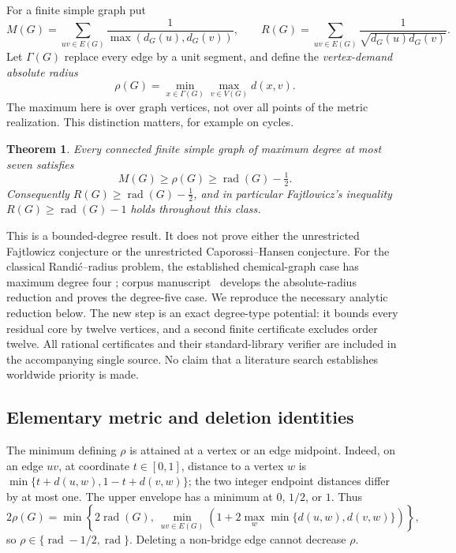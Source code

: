 \documentclass[11pt,a4paper]{article}
\newtheorem{theorem}{Theorem}[section]
\theoremstyle{definition}\newtheorem{definition}[theorem]{Definition}
\theoremstyle{remark}\newtheorem{remark}[theorem]{Remark}
\begin{document}
For a finite simple graph put
\[
 M(G)=\sum_{uv\in E(G)}\frac1{\max(d_G(u),d_G(v))},
 \qquad R(G)=\sum_{uv\in E(G)}\frac1{\sqrt{d_G(u)d_G(v)}}.
\]
Let $\Gamma(G)$ replace every edge by a unit segment, and define the
\emph{vertex-demand absolute radius}
\[
 \rho(G)=\min_{x\in\Gamma(G)}\max_{v\in V(G)}d(x,v).
\]
The maximum here is over graph vertices, not over all points of the
metric realization. This distinction matters, for example on cycles.

\begin{theorem}\label{thm:g7-main}
Every connected finite simple graph of maximum degree at most seven satisfies
\[
 M(G)\ge\rho(G)\ge\operatorname{rad}(G)-\tfrac12.
\]
Consequently $R(G)\ge\operatorname{rad}(G)-\tfrac12$, and in particular
Fajtlowicz's inequality $R(G)\ge\operatorname{rad}(G)-1$ holds throughout
this class.
\end{theorem}

This is a bounded-degree result. It does not prove either the unrestricted
Fajtlowicz conjecture or the unrestricted Caporossi--Hansen conjecture.
For the classical Randi\'c--radius problem, the established
chemical-graph case has maximum degree four \cite{CPS}; corpus manuscript~\cite{Corpus087} develops the absolute-radius
reduction and proves the degree-five case. We reproduce the necessary
analytic reduction below. The new step is an exact degree-type potential:
it bounds every residual core by twelve vertices, and a second finite
certificate excludes order twelve. All rational certificates and their
standard-library verifier are included in the accompanying single source.
No claim that a literature search establishes worldwide priority is made.

\subsection{Elementary metric and deletion identities}

The minimum defining $\rho$ is attained at a vertex or an edge midpoint.
Indeed, on an edge $uv$, at coordinate $t\in[0,1]$, distance to a vertex
$w$ is $\min\{t+d(u,w),1-t+d(v,w)\}$; the two integer endpoint distances
differ by at most one. The upper envelope has a minimum at $0$, $1/2$,
or $1$. Thus
\begin{equation}\label{eq:g7-rhoformula}
 2\rho(G)=\min\left\{
 2\operatorname{rad}(G),\
 \min_{uv\in E(G)}\left(1+2\max_w\min\{d(u,w),d(v,w)\}\right)
 \right\},
\end{equation}
so $\rho\in\{\operatorname{rad}-1/2,\operatorname{rad}\}$.
Deleting a non-bridge edge cannot decrease $\rho$.
\end{document}
